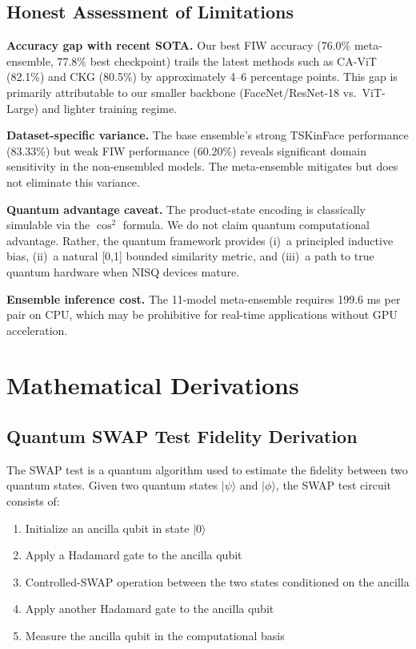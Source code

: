 \documentclass[journal,12pt]{IEEEtran}
\begin{document}
\subsection{Honest Assessment of Limitations}

\textbf{Accuracy gap with recent SOTA.} Our best FIW accuracy (76.0\%
meta-ensemble, 77.8\% best checkpoint) trails the latest methods such as
CA-ViT (82.1\%) and CKG (80.5\%) by approximately 4--6 percentage points.
This gap is primarily attributable to our smaller backbone (FaceNet/ResNet-18
vs.\ ViT-Large) and lighter training regime.

\textbf{Dataset-specific variance.} The base ensemble's strong TSKinFace
performance (83.33\%) but weak FIW performance (60.20\%) reveals
significant domain sensitivity in the non-ensembled models. The
meta-ensemble mitigates but does not eliminate this variance.

\textbf{Quantum advantage caveat.} The product-state encoding is
classically simulable via the $\cos^2$ formula. We do not claim
quantum computational advantage. Rather, the quantum framework provides
(i)~a principled inductive bias, (ii)~a natural [0,1] bounded similarity
metric, and (iii)~a path to true quantum hardware when NISQ devices
mature.

\textbf{Ensemble inference cost.} The 11-model meta-ensemble requires
199.6 ms per pair on CPU, which may be prohibitive for real-time
applications without GPU acceleration.

\section{Mathematical Derivations}
\label{sec:math_derivations}

\subsection{Quantum SWAP Test Fidelity Derivation}
The SWAP test is a quantum algorithm used to estimate the fidelity between
two quantum states. Given two quantum states $|\psi\rangle$ and
$|\phi\rangle$, the SWAP test circuit consists of:
\begin{enumerate}
    \item Initialize an ancilla qubit in state $|0\rangle$
    \item Apply a Hadamard gate to the ancilla qubit
    \item Controlled-SWAP operation between the two states conditioned on
          the ancilla
    \item Apply another Hadamard gate to the ancilla qubit
    \item Measure the ancilla qubit in the computational basis
\end{enumerate}
\end{document}
